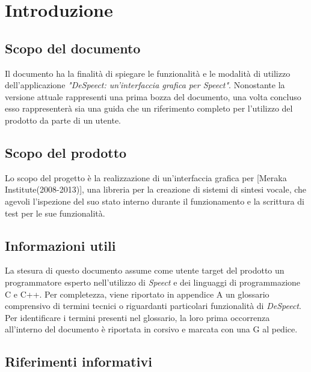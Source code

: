\documentclass[openany,12pt,a4paper]{report}
\begin{document}

	
	\tableofcontents
	
	
	\chapter{Introduzione}
	
	\section{Scopo del documento}
	
	Il documento ha la finalità di spiegare le funzionalità e le modalità di utilizzo dell’applicazione
	\textit{"DeSpeect: un'interfaccia grafica per Speect"}. Nonostante la versione attuale rappresenti una prima bozza del documento, una volta concluso esso rappresenterà sia una guida che un riferimento completo per l’utilizzo del prodotto da parte di un utente.
	
	\section{Scopo del prodotto}
	
	Lo scopo del progetto è la realizzazione di un’interfaccia grafica per  [Meraka Institute(2008-2013)], una libreria per la creazione di sistemi di sintesi vocale, che agevoli l’ispezione del suo stato interno durante il funzionamento e la scrittura di test per le sue funzionalità.
	
	\section{Informazioni utili}
	
	La stesura di questo documento assume come utente target del prodotto un programmatore esperto nell'utilizzo di \textit{Speect} e dei linguaggi di programmazione C e C++.
	Per completezza, viene riportato in appendice A un glossario comprensivo di termini tecnici o riguardanti particolari funzionalità di \textit{DeSpeect}. Per identificare i termini
	presenti nel glossario, la loro prima occorrenza all’interno del documento è riportata in corsivo e
	marcata con una G al pedice.
	
	\section*{Riferimenti informativi}
\end{document}
